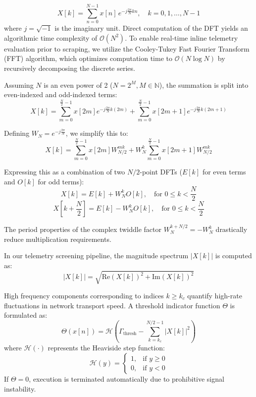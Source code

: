 \documentclass{article}
\begin{document}
\begin{equation}
X[k] = \sum_{n=0}^{N-1} x[n] \, e^{-j \frac{2\pi}{N} k n}, \quad k = 0, 1, \dots, N-1
\end{equation}
where $j = \sqrt{-1}$ is the imaginary unit. Direct computation of the DFT yields an algorithmic time complexity of $\mathcal{O}(N^2)$. To enable real-time inline telemetry evaluation prior to scraping, we utilize the Cooley-Tukey Fast Fourier Transform (FFT) algorithm, which optimizes computation time to $\mathcal{O}(N \log N)$ by recursively decomposing the discrete series.

Assuming $N$ is an even power of 2 ($N = 2^M, M \in \mathbb{N}$), the summation is split into even-indexed and odd-indexed terms:
\begin{equation}
X[k] = \sum_{m=0}^{\frac{N}{2}-1} x[2m] e^{-j \frac{2\pi}{N} k (2m)} + \sum_{m=0}^{\frac{N}{2}-1} x[2m+1] e^{-j \frac{2\pi}{N} k (2m+1)}
\end{equation}

Defining $W_N = e^{-j \frac{2\pi}{N}}$, we simplify this to:
\begin{equation}
X[k] = \sum_{m=0}^{\frac{N}{2}-1} x[2m] W_{N/2}^{m k} + W_N^k \sum_{m=0}^{\frac{N}{2}-1} x[2m+1] W_{N/2}^{m k}
\end{equation}

Expressing this as a combination of two $N/2$-point DFTs ($E[k]$ for even terms and $O[k]$ for odd terms):
\begin{equation}
X[k] = E[k] + W_N^k O[k], \quad \text{for } 0 \le k < \frac{N}{2}
\end{equation}
\begin{equation}
X\left[k + \frac{N}{2}\right] = E[k] - W_N^k O[k], \quad \text{for } 0 \le k < \frac{N}{2}
\end{equation}

The period properties of the complex twiddle factor $W_N^{k + N/2} = -W_N^k$ drastically reduce multiplication requirements. 

In our telemetry screening pipeline, the magnitude spectrum $|X[k]|$ is computed as:
\begin{equation}
|X[k]| = \sqrt{\text{Re}(X[k])^2 + \text{Im}(X[k])^2}
\end{equation}

High frequency components corresponding to indices $k \ge k_c$ quantify high-rate fluctuations in network transport speed. A threshold indicator function $\Theta$ is formulated as:
\begin{equation}
\Theta(x[n]) = \mathcal{H}\left( \Gamma_{\text{thresh}} - \sum_{k=k_c}^{N/2-1} |X[k]|^2 \right)
\end{equation}
where $\mathcal{H}(\cdot)$ represents the Heaviside step function:
\begin{equation}
\mathcal{H}(y) = \begin{cases} 
1, & \text{if } y \ge 0 \\
0, & \text{if } y < 0 
\end{cases}
\end{equation}
If $\Theta = 0$, execution is terminated automatically due to prohibitive signal instability.
\end{document}
